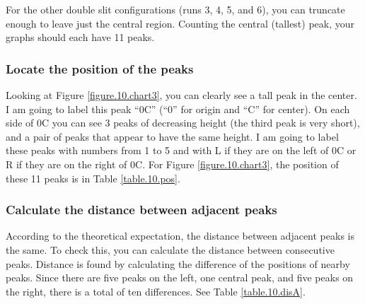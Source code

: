 For the other double slit configurations (runs 3, 4, 5, and 6), you can truncate enough to leave just the central region. Counting the central (tallest) peak, your graphs should each have 11 peaks.
\subsubsection{Locate the position of the peaks}
Looking at Figure \ref{figure.10.chart3}, you can clearly see a tall peak in the center. I am going to label this peak ``0C'' (``0'' for origin and ``C'' for center). On each side of 0C you can see 3 peaks of decreasing height (the third peak is very short), and a pair of peaks that appear to have the same height. I am going to label these peaks with numbers from 1 to 5 and with L if they are on the left of 0C or R if they are on the right of 0C. For Figure \ref{figure.10.chart3}, the position of these 11 peaks is in Table \ref{table.10.pos}.
\subsubsection{Calculate the distance between adjacent peaks}
According to the theoretical expectation, the distance between adjacent peaks is the same. To check this, you can calculate the distance between consecutive peaks. Distance is found by calculating the difference of the positions of nearby peaks. Since there are five peaks on the left, one central peak, and five peaks on the right, there is a total of ten differences. See Table \ref{table.10.disA}.
